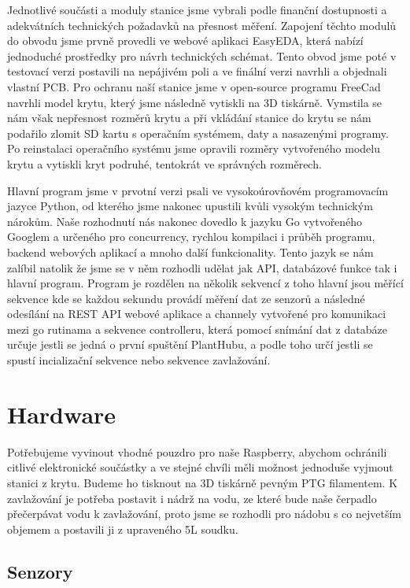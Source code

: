 \documentclass[12pt,a4paper]{article}
\begin{document}
Jednotlivé součásti a moduly stanice jsme vybrali podle finanční dostupnosti a
adekvátních technických
požadavků na přesnost měření.
Zapojení těchto modulů do obvodu jsme prvně provedli ve webové aplikaci
EasyEDA, která nabízí jednoduché prostředky pro návrh technických
schémat. Tento obvod jsme poté v testovací verzi postavili na nepájivém
poli a ve finální verzi navrhli a objednali vlastní PCB. Pro ochranu naší
stanice jsme v open-source programu FreeCad navrhli model krytu, který jsme
následně vytiskli na 3D tiskárně. Vymstila se nám však nepřesnost rozměrů krytu
a při vkládání stanice do krytu se nám podařilo zlomit SD kartu s operačním
systémem, daty a nasazenými programy. Po reinstalaci operačního systému jsme
opravili rozměry vytvořeného modelu krytu a
vytiskli kryt podruhé, tentokrát ve správných rozměrech.

Hlavní program jsme v prvotní verzi psali ve vysokoúrovňovém programovacím
jazyce Python, od kterého jsme nakonec upustili kvůli vysokým technickým
nárokům. Naše rozhodnutí nás nakonec dovedlo k jazyku
Go vytvořeného Googlem a určeného pro concurrency, rychlou kompilaci i průběh
programu, backend webových aplikací a mnoho
další funkcionality. Tento jazyk se nám zalíbil natolik že jsme se v něm
rozhodli
udělat jak API,
databázové funkce tak i hlavní program. Program je rozdělen na několik sekvencí
z toho hlavní jsou měřící sekvence kde se každou sekundu provádí měření dat ze
senzorů a následné odesílání na REST API webové aplikace a channely vytvořené
pro komunikaci mezi go rutinama a sekvence controlleru, která pomocí snímání
dat z databáze určuje jestli se jedná o první spuštění PlantHubu, a podle toho
určí jestli se spustí incializační sekvence nebo sekvence zavlažování.

\section{Hardware}

Potřebujeme vyvinout vhodné pouzdro pro naše Raspberry, abychom ochránili
citlivé elektronické součástky a ve stejné chvíli měli možnost jednoduše
vyjmout stanici z krytu. Budeme ho tisknout na 3D tiskárně pevným PTG
filamentem. K
zavlažování je potřeba postavit i nádrž na vodu, ze které bude naše čerpadlo
přečerpávat vodu k zavlažování, proto jsme se rozhodli pro nádobu s co
nejvetším objemem a postavili ji z upraveného 5L soudku.

\subsection{Senzory}
\end{document}

